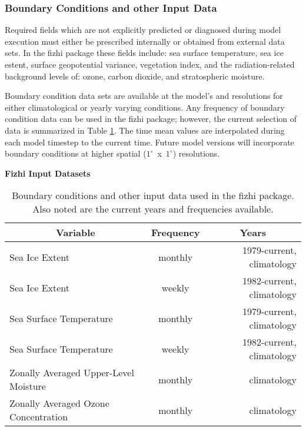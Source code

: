\subsubsection{Boundary Conditions and other Input Data}

Required fields which are not explicitly predicted or diagnosed during model execution must
either be prescribed internally or obtained from external data sets.  In the fizhi package these
fields include:  sea surface temperature, sea ice estent, surface geopotential variance, 
vegetation index, and the radiation-related background levels of: ozone, carbon dioxide, 
and stratospheric moisture.

Boundary condition data sets are available at the model's \fxf and \txt 
resolutions for either climatological or yearly varying conditions. 
Any frequency of boundary condition data can be used in the fizhi package; 
however, the current selection of data is summarized in Table \ref{tab:fizhi:bcdata}\@.
The time mean values are interpolated during each model timestep to the 
current time. Future model versions will incorporate boundary conditions at
higher spatial \mbox{($1^\circ$ x $1^\circ$)} resolutions.

\begin{table}[htb]
\begin{center}
{\bf Fizhi Input Datasets} \\
\vspace{0.1in}
\begin{tabular}{|l|c|r|} \hline
\multicolumn{1}{|c}{Variable} & \multicolumn{1}{|c}{Frequency} & \multicolumn{1}{|c|}{Years} \\ \hline\hline
Sea Ice Extent & monthly & 1979-current, climatology \\ \hline
Sea Ice Extent & weekly  & 1982-current, climatology \\ \hline
Sea Surface Temperature & monthly & 1979-current, climatology \\ \hline
Sea Surface Temperature & weekly & 1982-current, climatology \\ \hline
Zonally Averaged Upper-Level Moisture & monthly  & climatology \\ \hline
Zonally Averaged Ozone Concentration & monthly  & climatology \\ \hline
\end{tabular}
\end{center}
\caption{Boundary conditions and other input data used in the fizhi package.  Also noted are the
current years and frequencies available.}
\label{tab:fizhi:bcdata}
\end{table}


